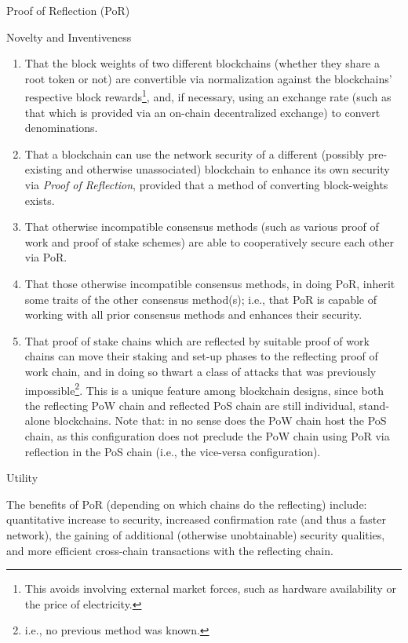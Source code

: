 \documentclass[a4paper,]{article}
\providecommand{\tightlist}{%
  \setlength{\itemsep}{0pt}\setlength{\parskip}{0pt}}
\begin{document}
\begin{section}{Proof of Reflection (PoR)}
\begin{subsection}{Novelty and Inventiveness}
    \begin{enumerate}
        \def\labelenumi{\arabic{enumi}.}
        \tightlist
        \item
            That the block weights of two different blockchains (whether they share a root token or not) are convertible via normalization against the blockchains' respective block rewards\footnote{This avoids involving external market forces, such as hardware availability or the price of electricity.}, and, if necessary, using an exchange rate (such as that which is provided via an on-chain decentralized exchange) to convert denominations.
        \item
            That a blockchain can use the network security of a different (possibly pre-existing and otherwise unassociated) blockchain to enhance its own security via \emph{Proof of Reflection}, provided that a method of converting block-weights exists.
        \item
            That otherwise incompatible consensus methods (such as various proof of work and proof of stake schemes) are able to cooperatively secure each other via PoR.
        \item
            That those otherwise incompatible consensus methods, in doing PoR, inherit some traits of the other consensus method(s); i.e., that PoR is capable of working with all prior consensus methods and enhances their security.
        \item
            That proof of stake chains which are reflected by suitable proof of work chains can move their staking and set-up phases to the reflecting proof of work chain, and in doing so thwart a class of attacks that was previously impossible\footnote{i.e., no previous method was known.}. This is a unique feature among blockchain designs, since both the reflecting PoW chain and reflected PoS chain are still individual, stand-alone blockchains. Note that: in no sense does the PoW chain host the PoS chain, as this configuration does not preclude the PoW chain using PoR via reflection in the PoS chain (i.e., the vice-versa configuration).
    \end{enumerate}

 \end{subsection}
 \begin{subsection}{Utility}

    The benefits of PoR (depending on which chains do the reflecting) include: quantitative increase to security, increased confirmation rate (and thus a faster network), the gaining of additional (otherwise unobtainable) security qualities, and more efficient cross-chain transactions with the reflecting chain.

 \end{subsection}
\end{section}
\end{document}

